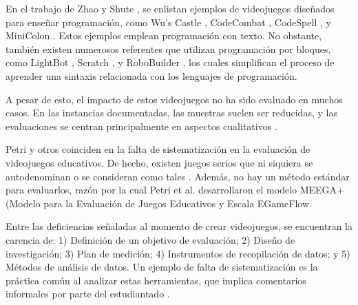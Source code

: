 En el trabajo de Zhao y Shute \cite{video_game_foster_computational_thinking}, se enlistan ejemplos de videojuegos diseñados para enseñar programación, como Wu's Castle \cite{wuscastle}, CodeCombat \cite{CodeCombat}, CodeSpell \cite{codespells}, y MiniColon \cite{minicolon}. Estos ejemplos emplean programación con texto. No obstante, también existen numerosos referentes que utilizan programación por bloques, como LightBot \cite{LightBot}, Scratch \cite{ scratch, maloney2010scratch}, y RoboBuilder \cite{RoboBuilder}, los cuales simplifican el proceso de aprender una sintaxis relacionada con los lenguajes de programación.

A pesar de esto, el impacto de estos videojuegos no ha sido evaluado en muchos casos. En las instancias documentadas, las muestras suelen ser reducidas, y las evaluaciones se centran principalmente en aspectos cualitativos \cite{video_game_foster_computational_thinking, effectiveness_gbl}.

Petri y otros \cite{meegaplus} coinciden en la falta de sistematización en la evaluación de videojuegos educativos. De hecho, existen juegos serios que ni siquiera se autodenominan o se consideran como tales \cite{evaluation_of_games_for_teaching_cs}. Además, no hay un método estándar para evaluarlos, razón por la cual Petri et al. \cite{meegaplus} desarrollaron el modelo MEEGA+ (Modelo para la Evaluación de Juegos Educativos y Escala EGameFlow.

Entre las deficiencias señaladas al momento de crear videojuegos, se encuentran la carencia de: 1) Definición de un objetivo de evaluación; 2) Diseño de investigación; 3) Plan de medición; 4) Instrumentos de recopilación de datos; y 5) Métodos de análisis de datos. Un ejemplo de falta de sistematización es la práctica común al analizar estas herramientas, que implica comentarios informales por parte del estudiantado \cite{meegaplus}.

